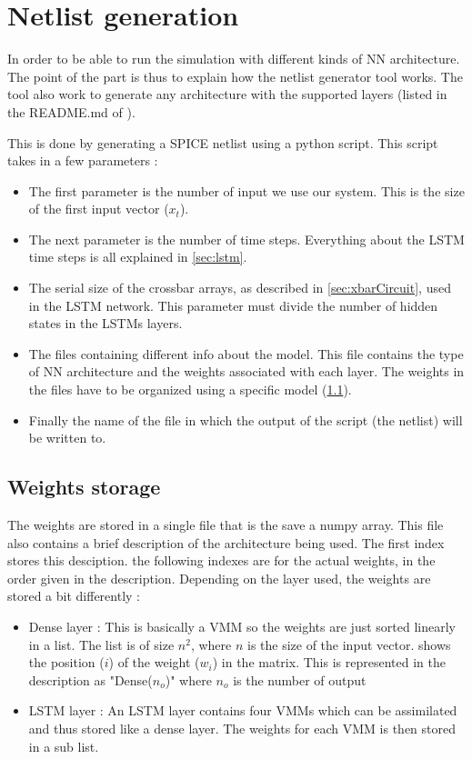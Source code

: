 \section{Netlist generation}
\label{sec:netlist}

In order to be able to run the simulation with different kinds of \ac{NN} architecture. The point of the part is thus to explain how the netlist generator tool works. The tool also work to generate any architecture with the supported layers (listed in the README.md of \cite{lstmGen}).

This is done by generating a SPICE netlist using a python script. This script takes in a few parameters :

\begin{itemize}
  \item The first parameter is the number of input we use our system. This is the size of the first input vector ($x_t$).
  \item The next parameter is the number of time steps. Everything about the \ac{LSTM} time steps is all explained in \cref{sec:lstm}.
  \item The serial size of the crossbar arrays, as described in \cref{sec:xbarCircuit}, used in the \ac{LSTM} network. This parameter must divide the number of hidden states in the \acp{LSTM} layers.
  \item The files containing different info about the model. This file contains the type of \ac{NN} architecture and the weights associated with each layer. The weights in the files have to be organized using a specific model (\cref{subsec:weiStore}).
  \item Finally the name of the file in which the output of the script (the netlist) will be written to.
\end{itemize}

\subsection{Weights storage}\label{subsec:weiStore}


The weights are stored in a single file that is the save a numpy array. This file also contains a brief description of the architecture being used. The first index stores this desciption. the following indexes are for the actual weights, in the order given in the description. Depending on the layer used, the weights are stored a bit differently :

\begin{itemize}
  \item Dense layer : This is basically a \ac{VMM} so the weights are just sorted linearly in a list. The list is of size $n^2$, where $n$ is the size of the input vector.  shows the position ($i$) of the weight ($w_i$) in the matrix. This is represented in the description as "Dense($n_o$)" where $n_o$ is the number of output
  \item \ac{LSTM} layer : An \ac{LSTM} layer contains four \acp{VMM} which can be assimilated and thus stored like a dense layer. The weights for each \ac{VMM} is then stored in a sub list.
\end{itemize}

